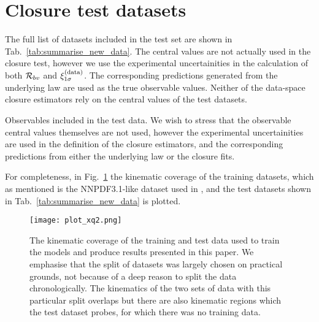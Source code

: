 \section{Closure test datasets}
\label{sec:appendix-datasets}

The full list of datasets included in the test set are shown in
Tab.~\ref{tab:summarise_new_data}. The central values are not actually used
in the closure test, however we use the experimental uncertainities in
the calculation of both $\mathcal{R}_{bv}$ and $\xi^{(\rm data)}_{1 \sigma}$. The corresponding
predictions generated from the underlying law are used as the true
observable values. Neither of the data-space closure estimators rely on
the central values of the test datasets.

\begin{table}[h!]
    \begin{center}
        
    \end{center}
    \caption{
        Observables included in the test data. We wish to stress that the observable
        central values themselves are not used, however the experimental
        uncertainities are used in the definition of the closure estimators, and
        the corresponding predictions from either the underlying law or the
        closure fits.
    }
    \label{tab:summarise_new_data}
\end{table}

For completeness, in Fig.~\ref{fig:DataKinematicCoverage}
the kinematic coverage of the training datasets, which
as mentioned is the NNPDF3.1-like dataset used in \cite{Faura_2020}, and the
test datasets shown in Tab.~\ref{tab:summarise_new_data} is plotted.

\begin{figure}
    \centering
    \texttt{[image: plot\_xq2.png]}
    \caption{The kinematic coverage of the training and test data
    used to train the models and produce results presented in this paper. We emphasise
    that the split of datasets was largely chosen on practical grounds, not because
    of a deep reason to split the data chronologically. The kinematics of the two
    sets of data with this particular split overlaps but there are also kinematic
    regions which the test dataset probes, for which there was no training data.}
    \label{fig:DataKinematicCoverage}
\end{figure}
